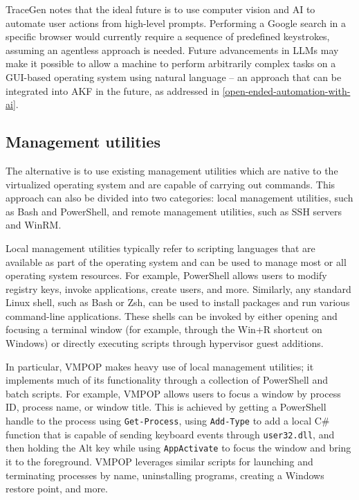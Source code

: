 \documentclass[letterpaper,12pt]{report}
\newcommand{\passthrough}[1]{#1}
\begin{document}
TraceGen \cite{duTraceGenUserActivity2021} notes that the ideal
future is to use computer vision and AI to automate user actions from
high-level prompts. Performing a Google search in a specific browser
would currently require a sequence of predefined keystrokes, assuming an
agentless approach is needed. Future advancements in LLMs may make it
possible to allow a machine to perform arbitrarily complex tasks on a
GUI-based operating system using natural language -- an approach that
can be integrated into AKF in the future, as addressed in \autoref{open-ended-automation-with-ai}.

\subsection{Management utilities}\label{management-utilities}

The alternative is to use existing management utilities which are native
to the virtualized operating system and are capable of carrying out
commands. This approach can also be divided into two categories: local
management utilities, such as Bash and PowerShell, and remote management
utilities, such as SSH servers and WinRM.

Local management utilities typically refer to scripting languages that
are available as part of the operating system and can be used to manage
most or all operating system resources. For example, PowerShell allows
users to modify registry keys, invoke applications, create users, and
more. Similarly, any standard Linux shell, such as Bash or Zsh, can be
used to install packages and run various command-line applications.
These shells can be invoked by either opening and focusing a terminal
window (for example, through the Win+R shortcut on Windows) or directly
executing scripts through hypervisor guest additions.

In particular, VMPOP \cite{parkTREDEVMPOPCultivating2018} makes
heavy use of local management utilities; it implements much of its
functionality through a collection of PowerShell and batch scripts. For
example, VMPOP allows users to focus a window by process ID, process
name, or window title. This is achieved by getting a PowerShell handle
to the process using \passthrough{\lstinline!Get-Process!}, using
\passthrough{\lstinline!Add-Type!} to add a local C\# function that is
capable of sending keyboard events through
\passthrough{\lstinline!user32.dll!}, and then holding the Alt key while
using \passthrough{\lstinline!AppActivate!} to focus the window and
bring it to the foreground. VMPOP leverages similar scripts for
launching and terminating processes by name, uninstalling programs,
creating a Windows restore point, and more.
\end{document}
